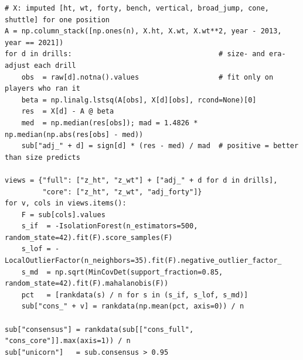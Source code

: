 \documentclass[11pt]{article}
\begin{document}
\begin{lstlisting}
# X: imputed [ht, wt, forty, bench, vertical, broad_jump, cone, shuttle] for one position
A = np.column_stack([np.ones(n), X.ht, X.wt, X.wt**2, year - 2013, year == 2021])
for d in drills:                                   # size- and era-adjust each drill
    obs  = raw[d].notna().values                   # fit only on players who ran it
    beta = np.linalg.lstsq(A[obs], X[d][obs], rcond=None)[0]
    res  = X[d] - A @ beta
    med  = np.median(res[obs]); mad = 1.4826 * np.median(np.abs(res[obs] - med))
    sub["adj_" + d] = sign[d] * (res - med) / mad  # positive = better than size predicts

views = {"full": ["z_ht", "z_wt"] + ["adj_" + d for d in drills],
         "core": ["z_ht", "z_wt", "adj_forty"]}
for v, cols in views.items():
    F = sub[cols].values
    s_if  = -IsolationForest(n_estimators=500, random_state=42).fit(F).score_samples(F)
    s_lof = -LocalOutlierFactor(n_neighbors=35).fit(F).negative_outlier_factor_
    s_md  = np.sqrt(MinCovDet(support_fraction=0.85, random_state=42).fit(F).mahalanobis(F))
    pct   = [rankdata(s) / n for s in (s_if, s_lof, s_md)]
    sub["cons_" + v] = rankdata(np.mean(pct, axis=0)) / n

sub["consensus"] = rankdata(sub[["cons_full", "cons_core"]].max(axis=1)) / n
sub["unicorn"]   = sub.consensus > 0.95
\end{lstlisting}
\end{document}

